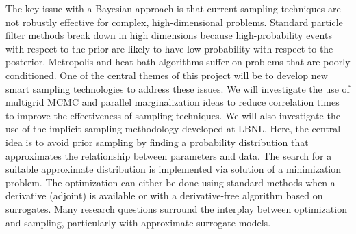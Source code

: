 \documentclass[11pt]{article}
\newcommand{\MarginPar}[1]{\marginpar{%
\vskip-\baselineskip %
\raggedright\tiny\sffamily
\hrule\smallskip{\color{red}#1}\par\smallskip\hrule}}
\begin{document}
The key issue with a Bayesian approach is that current sampling techniques
are not robustly effective for complex, high-dimensional problems.
Standard particle filter methods break down in high dimensions because high-probability events 
with respect to the prior are likely to have low probability with respect to the posterior. 
Metropolis and heat bath algorithms suffer on problems that are poorly conditioned.
One of the central themes of this project will be to develop new smart sampling technologies 
to address these issues.
We will investigate the use of multigrid MCMC and parallel marginalization ideas to reduce correlation
times to improve the effectiveness of sampling techniques.
We will also investigate the use of the implicit sampling methodology developed at LBNL.
Here, the central idea is to avoid prior sampling by finding a probability distribution that approximates the
relationship between parameters and data.  The search for a suitable approximate distribution is implemented
via solution of a minimization problem.
The optimization can either be done using standard methods when a derivative (adjoint) is available
or with a derivative-free algorithm based on surrogates.
Many research questions surround the interplay between optimization and
sampling, particularly with approximate surrogate models.
\end{document}
